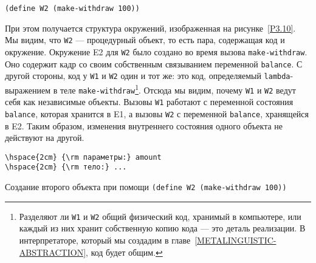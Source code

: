 \begin{Verbatim}[fontsize=\small]
(define W2 (make-withdraw 100))
\end{Verbatim}
При этом получается структура окружений, изображенная на
рисунке~\ref{P3.10}.  Мы видим, что {\tt W2} ---
процедурный объект, то есть пара, содержащая код и окружение.
Окружение E2 для {\tt W2} было создано во время вызова
{\tt make-with\-draw}.  Оно содержит кадр со своим собственным
связыванием переменной {\tt balance}.  С другой стороны, код у
{\tt W1} и {\tt W2} один и тот же: это код, определяемый
{\tt lambda}-выражением в теле
{\tt make-withdraw}\footnote{Разделяют ли {\tt W1} и {\tt W2} общий
физический код, хранимый в компьютере, или каждый из них хранит
собственную копию кода --- это деталь реализации.  В интерпретаторе,
который мы создадим в
главе~\ref{METALINGUISTIC-ABSTRACTION}, код будет общим.}.
Отсюда мы видим, почему {\tt W1} и {\tt W2} ведут себя как
независимые объекты.  Вызовы {\tt W1} работают с переменной
состояния {\tt balance}, которая хранится в E1, а вызовы
{\tt W2} с переменной {\tt balance}, хранящейся в E2.
Таким образом, изменения внутреннего состояния одного объекта не
действуют на другой.


\begin{cntrfig}

\begin{Verbatim}
\hspace{2cm} {\rm параметры:} amount
\hspace{2cm} {\rm тело:} ...
\end{Verbatim}
\caption{Создание второго объекта при помощи {\tt (define W2 (make-withdraw 100))}}
\label{P3.10}
\end{cntrfig}

